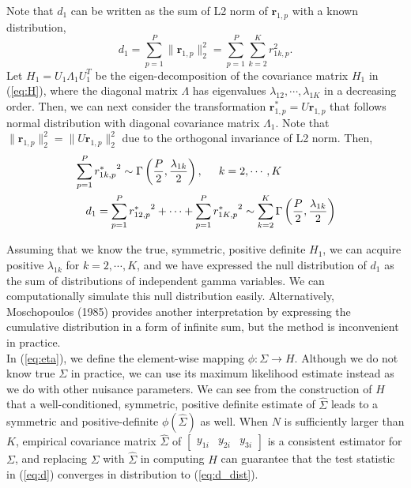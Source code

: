 \documentclass[aoas,authoryear, preprint]{imsart}
\numberwithin{equation}{section}
\theoremstyle{plain}
\begin{document}
\noindent Note that $d_1$ can be written as the sum of L2 norm of $\bm{r}_{1,p}$ with a known distribution, 
\begin{equation}
d_1 = \sum_{p=1}^{P} \|\bm{r}_{1,p}\|_2^2 = \sum_{p=1}^{P} \sum_{k=2}^K r_{1k,p}^2.
\label{eq:d2}
\end{equation}
Let $H_1 = U_1 \Lambda_1 U_1^T$ be the eigen-decomposition of the covariance matrix $H_1$ in (\ref{eq:H}), where the diagonal matrix $\Lambda$ has eigenvalues $\lambda_{12}, \cdots, \lambda_{1K}$ in a decreasing order. Then, we can next consider the transformation $\bm{r}_{1,p}^* = U\bm{r}_{1,p}$ that follows normal distribution with diagonal covariance matrix $\Lambda_1$. Note that $\|\bm{r}_{1,p}\|_2^2 = \|U\bm{r}_{1,p}\|_2^2$ due to the orthogonal invariance of L2 norm. Then,
\begin{equation}
    \begin{multlined}
    \sum_{p=1}^{P} {r_{1k,p}^*}^2 \sim \Gamma \left( \frac{P}{2}, \frac{\lambda_{1k}}{2} \right), \hspace{5mm} k = 2, \cdots, K\\
    d_1 =  \sum_{p=1}^{P} {r_{12,p}^*}^2 + \cdots +\sum_{p=1}^P{r_{1K,p}^*}^2 \sim \sum_{k=2}^{K} \Gamma \left( \frac{P}{2}, \frac{\lambda_{1k}}{2}\right)
    \end{multlined}
    \label{eq:d_dist}
\end{equation}

Assuming that we know the true, symmetric, positive definite $H_1$, we can acquire positive $\lambda_{1k}$ for $k = 2, \cdots, K$, and we have expressed the null distribution of $d_1$ as the sum of distributions of independent gamma variables. We can computationally simulate this null distribution easily. Alternatively, Moschopoulos (1985) provides another interpretation by expressing the cumulative distribution in a form of infinite sum, but the method is inconvenient in practice.\\ 

In (\ref{eq:eta}), we define the element-wise mapping $\phi: \Sigma \rightarrow H$. Although we do not know true $\Sigma$ in practice, we can use its maximum likelihood estimate instead as we do with other nuisance parameters. We can see from the construction of $H$ that a well-conditioned, symmetric, positive definite estimate of $\hat{\Sigma}$ leads to a symmetric and positive-definite $\phi(\hat{\Sigma})$ as well. When $N$ is sufficiently larger than $K$, empirical covariance matrix $\hat{\Sigma}$ of $\begin{bmatrix} y_{1i} & y_{2i} & y_{3i} \end{bmatrix}$ is a consistent estimator for $\Sigma$, and replacing $\Sigma$ with $\hat{\Sigma}$ in computing $H$ can guarantee that the test statistic in (\ref{eq:d}) converges in distribution to (\ref{eq:d_dist}). \\
\end{document}
